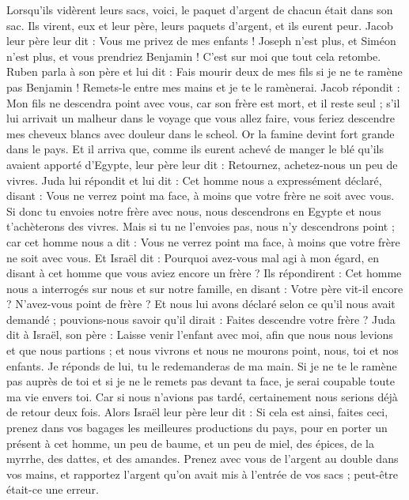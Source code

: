 \begin{multicols}{2}
Lorsqu'ils vidèrent leurs sacs, voici, le paquet d'argent de chacun était dans son sac. Ils virent, eux et leur père, leurs paquets d'argent, et ils eurent peur.
Jacob leur père leur dit : Vous me privez de mes enfants ! Joseph n'est plus, et Siméon n'est plus, et vous prendriez Benjamin ! C'est sur moi que tout cela retombe.
Ruben parla à son père et lui dit : Fais mourir deux de mes fils si je ne te ramène pas Benjamin ! Remets-le entre mes mains et je te le ramènerai.
Jacob répondit : Mon fils ne descendra point avec vous, car son frère est mort, et il reste seul ; s'il lui arrivait un malheur dans le voyage que vous allez faire, vous feriez descendre mes cheveux blancs avec douleur dans le scheol.
\VerseOne{}Or la famine devint fort grande dans le pays.
Et il arriva que, comme ils eurent achevé de manger le blé qu'ils avaient apporté d'Egypte, leur père leur dit : Retournez, achetez-nous un peu de vivres.
Juda lui répondit et lui dit : Cet homme nous a expressément déclaré, disant : Vous ne verrez point ma face, à moins que votre frère ne soit avec vous.
Si donc tu envoies notre frère avec nous, nous descendrons en Egypte et nous t'achèterons des vivres.
Mais si tu ne l'envoies pas, nous n'y descendrons point ; car cet homme nous a dit : Vous ne verrez point ma face, à moins que votre frère ne soit avec vous.
Et Israël dit : Pourquoi avez-vous mal agi à mon égard, en disant à cet homme que vous aviez encore un frère ?
Ils répondirent : Cet homme nous a interrogés sur nous et sur notre famille, en disant : Votre père vit-il encore ? N'avez-vous point de frère ? Et nous lui avons déclaré selon ce qu'il nous avait demandé ; pouvions-nous savoir qu'il dirait : Faites descendre votre frère ?
Juda dit à Israël, son père : Laisse venir l'enfant avec moi, afin que nous nous levions et que nous partions ; et nous vivrons et nous ne mourons point, nous, toi et nos enfants.
Je réponds de lui, tu le redemanderas de ma main. Si je ne te le ramène pas auprès de toi et si je ne le remets pas devant ta face, je serai coupable toute ma vie envers toi.
Car si nous n'avions pas tardé, certainement nous serions déjà de retour deux fois.
Alors Israël leur père leur dit : Si cela est ainsi, faites ceci, prenez dans vos bagages les meilleures productions du pays, pour en porter un présent à cet homme, un peu de baume, et un peu de miel, des épices, de la myrrhe, des dattes, et des amandes.
Prenez avec vous de l'argent au double dans vos mains, et rapportez l'argent qu'on avait mis à l'entrée de vos sacs ; peut-être était-ce une erreur.

\end{multicols}
